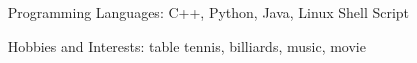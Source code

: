 \documentclass{joel_cv}
\begin{document}
%
%

\begin{description}{}
	\item{\ \ } Programming Languages: C++, Python, Java, Linux Shell Script
	\item{\ \ } Hobbies and Interests: table tennis, billiards, music, movie
\end{description}




\end{document}

